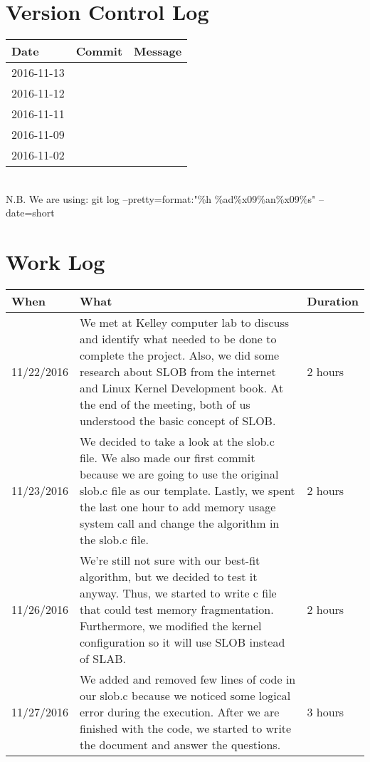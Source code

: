 \documentclass[letterpaper,10pt,draftclsnofoot,titlepage,onecolumn]{IEEEtran}
\begin{document}
	\clearpage

	\section{Version Control Log}
	
\begin{center}

\begin{tabular}{| m{2cm} | m{8cm} | m{4cm} | } 
\hline
 Date & Commit & Message \\ [0.5ex] 
 \hline\hline
2016-11-13 &  &  \\
 \hline 
  2016-11-12 &  & \\
 \hline
  2016-11-11 &  &  \\
 \hline
  2016-11-09 &  &  \\
 \hline
   2016-11-02 &  &  \\
 \hline
 
\end{tabular}

\end{center}
\hfill\\
N.B. We are using: git log --pretty=format:"\%h \%ad\%x09\%an\%x09\%s" --date=short
	
\clearpage

\section{Work Log}
\begin{center}
\begin{tabular}{ |m{2cm}|m{10cm}|m{2cm}| }
\hline
When & What & Duration \\ \hline
11/22/2016
& We met at Kelley computer lab to discuss and identify what needed to be done to complete the project. 
Also, we did some research about SLOB from the internet and Linux Kernel Development book.
At the end of the meeting, both of us understood the basic concept of SLOB.
& 2 hours\\ 
\hline

11/23/2016 
& We decided to take a look at the slob.c file. 
We also made our first commit because we are going to use the original slob.c file as our template.
Lastly, we spent the last one hour to add memory usage system call and change the algorithm in the slob.c file.
& 2 hours\\ 
\hline

11/26/2016 
& We're still not sure with our best-fit algorithm, but we decided to test it anyway. 
Thus, we started to write c file that could test memory fragmentation. 
Furthermore, we modified the kernel configuration so it will use SLOB instead of SLAB.
& 2 hours\\ 
\hline

11/27/2016 
& We added and removed few lines of code in our slob.c because we noticed some logical error
during the execution.
After we are finished with the code, we started to write the document and answer the questions.
& 3 hours\\ 
\hline

\end{tabular}
\end{center}
\end{document}
